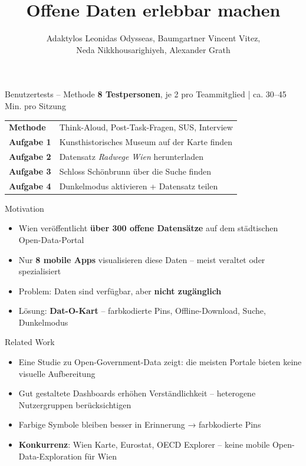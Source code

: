 \documentclass{beamer}
\title{Offene Daten erlebbar machen}
\date{}
\author{Adaktylos Leonidas Odysseas, Baumgartner Vincent Vitez,\\ Neda Nikkhousarighiyeh, Alexander Grath}
\begin{document}

  \begin{frame}{Benutzertests – Methode}
    \textbf{8 Testpersonen}, je 2 pro Teammitglied \quad | \quad ca. 30–45 Min. pro Sitzung

    \vspace{0.4cm}
    \begin{tabular}{@{}ll@{}}
      \textbf{Methode} & Think-Aloud, Post-Task-Fragen, SUS, Interview \\[0.4em]
      \textbf{Aufgabe 1} & Kunsthistorisches Museum auf der Karte finden \\
      \textbf{Aufgabe 2} & Datensatz \emph{Radwege Wien} herunterladen \\
      \textbf{Aufgabe 3} & Schloss Schönbrunn über die Suche finden \\
      \textbf{Aufgabe 4} & Dunkelmodus aktivieren + Datensatz teilen \\
    \end{tabular}
  \end{frame}

  \begin{frame}{Motivation}
    \begin{itemize}
      \setlength\itemsep{0.6em}
      \item Wien veröffentlicht \textbf{über 300 offene Datensätze} auf dem städtischen Open-Data-Portal
      \item Nur \textbf{8 mobile Apps} visualisieren diese Daten – meist veraltet oder spezialisiert
      \item Problem: Daten sind verfügbar, aber \textbf{nicht zugänglich}
      \item Lösung: \textbf{Dat-O-Kart} – farbkodierte Pins, Offline-Download, Suche, Dunkelmodus
    \end{itemize}
  \end{frame}

  \begin{frame}{Related Work}
    \begin{itemize}
      \setlength\itemsep{0.5em}
      \item Eine Studie zu Open-Government-Data zeigt: die meisten Portale bieten keine visuelle Aufbereitung
      \item Gut gestaltete Dashboards erhöhen Verständlichkeit – heterogene Nutzergruppen berücksichtigen
      \item Farbige Symbole bleiben besser in Erinnerung → farbkodierte Pins
      \item \textbf{Konkurrenz}: Wien Karte, Eurostat, OECD Explorer – keine mobile Open-Data-Exploration für Wien
    \end{itemize}
  \end{frame}
\end{document}
